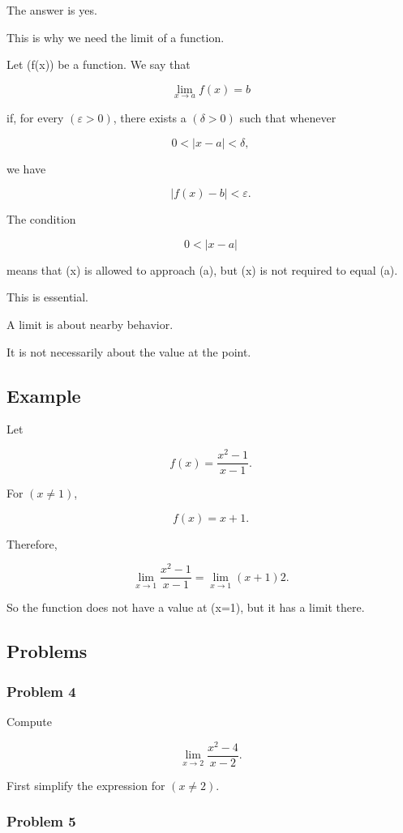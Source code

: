 The answer is yes.

This is why we need the limit of a function.

\begin{definition}
Let (f(x)) be a function. We say that

\[
\lim_{x\to a}f(x)=b
\]

if, for every $(\varepsilon>0)$, there exists a $(\delta>0)$ such that whenever

\[
0<|x-a|<\delta,
\]

we have

\[
|f(x)-b|<\varepsilon.
\]
\end{definition}

The condition

\[
0<|x-a|
\]

means that (x) is allowed to approach (a), but (x) is not required to equal (a).

This is essential.

A limit is about nearby behavior.

It is not necessarily about the value at the point.

\subsection{Example}

Let

\[
f(x)=\frac{x^2-1}{x-1}.
\]

For $(x\neq 1)$,

\[
f(x)=x+1.
\]

Therefore,

\[
\lim_{x\to 1}\frac{x^2-1}{x-1} = \lim_{x\to 1}(x+1) 2.
\]

So the function does not have a value at (x=1), but it has a limit there.

\subsection{Problems}

\subsubsection*{Problem 4}

Compute

\[
\lim_{x\to 2}\frac{x^2-4}{x-2}.
\]

First simplify the expression for $(x\neq 2)$.

\subsubsection*{Problem 5}

